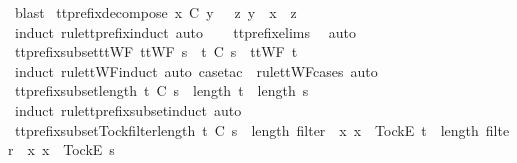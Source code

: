 \begin{isabellebody}
\ blast%
\endisatagproof
{\isafoldproof}%
%
\isadelimproof
\isanewline
%
\endisadelimproof
\isanewline
{}\isamarkupfalse%
\ tt{\isacharunderscore}prefix{\isacharunderscore}decompose{\isacharcolon}\ {\isachardoublequoteopen}x\ {\isasymle}\isactrlsub C\ y\ {\isasymLongrightarrow}\ {\isasymexists}\ z{\isachardot}\ y\ {\isacharequal}\ x\ {\isacharat}\ z{\isachardoublequoteclose}\isanewline
%
\isadelimproof
\ \ %
\endisadelimproof
%
\isatagproof
{}\isamarkupfalse%
\ {\isacharparenleft}induct\ rule{\isacharcolon}tt{\isacharunderscore}prefix{\isachardot}induct{\isacharcomma}\ auto{\isacharparenright}\isanewline
\ \ \isamarkupfalse%
\ tt{\isacharunderscore}prefix{\isachardot}elims{\isacharparenleft}{}{\isacharparenright}\ \isamarkupfalse%
\ auto%
\endisatagproof
{\isafoldproof}%
%
\isadelimproof
\isanewline
%
\endisadelimproof
\isanewline
{}\isamarkupfalse%
\ tt{\isacharunderscore}prefix{\isacharunderscore}subset{\isacharunderscore}ttWF{\isacharcolon}\ {\isachardoublequoteopen}ttWF\ s\ {\isasymLongrightarrow}\ t\ {\isasymlesssim}\isactrlsub C\ s\ {\isasymLongrightarrow}\ ttWF\ t{\isachardoublequoteclose}\isanewline
%
\isadelimproof
\ \ %
\endisadelimproof
%
\isatagproof
{}\isamarkupfalse%
\ {\isacharparenleft}induct\ rule{\isacharcolon}ttWF{}{\isachardot}induct{\isacharcomma}\ auto{\isacharcomma}\ {\isacharparenleft}case{\isacharunderscore}tac\ {\isasymrho}\ rule{\isacharcolon}ttWF{\isachardot}cases{\isacharcomma}\ auto{\isacharparenright}{\isacharplus}{\isacharparenright}%
\endisatagproof
{\isafoldproof}%
%
\isadelimproof
\isanewline
%
\endisadelimproof
\isanewline
{}\isamarkupfalse%
\ tt{\isacharunderscore}prefix{\isacharunderscore}subset{\isacharunderscore}length{\isacharcolon}\ {\isachardoublequoteopen}t\ {\isasymlesssim}\isactrlsub C\ s\ {\isasymLongrightarrow}\ length\ t\ {\isasymle}\ length\ s{\isachardoublequoteclose}\isanewline
%
\isadelimproof
\ \ %
\endisadelimproof
%
\isatagproof
{}\isamarkupfalse%
\ {\isacharparenleft}induct\ rule{\isacharcolon}tt{\isacharunderscore}prefix{\isacharunderscore}subset{\isachardot}induct{\isacharcomma}\ auto{\isacharparenright}%
\endisatagproof
{\isafoldproof}%
%
\isadelimproof
\isanewline
%
\endisadelimproof
\isanewline
{}\isamarkupfalse%
\ tt{\isacharunderscore}prefix{\isacharunderscore}subset{\isacharunderscore}Tock{\isacharunderscore}filter{\isacharunderscore}length{\isacharcolon}\ {\isachardoublequoteopen}t\ {\isasymlesssim}\isactrlsub C\ s\ {\isasymLongrightarrow}\ length\ {\isacharparenleft}filter\ {\isacharparenleft}{\isasymlambda}\ x{\isachardot}\ x\ {\isacharequal}\ {\isacharbrackleft}Tock{\isacharbrackright}\isactrlsub E{\isacharparenright}\ t{\isacharparenright}\ {\isasymle}\ length\ {\isacharparenleft}filter\ {\isacharparenleft}{\isasymlambda}\ x{\isachardot}\ x\ {\isacharequal}\ {\isacharbrackleft}Tock{\isacharbrackright}\isactrlsub E{\isacharparenright}\ s{\isacharparenright}{\isachardoublequoteclose}\isanewline

\end{isabellebody}
